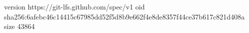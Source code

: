 version https://git-lfs.github.com/spec/v1
oid sha256:6afebc46c14415c67985dd52f5d8b9e662f4e8de8357f44ce37b617c821d408a
size 43864
